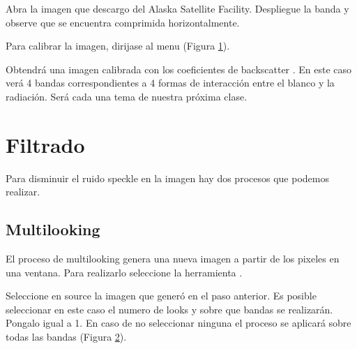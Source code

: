 Abra la imagen  que descargo del Alaska Satellite Facility. Despliegue la banda  y observe que se encuentra comprimida horizontalmente.

Para calibrar la imagen, dirijase al menu  (Figura \ref{fig:calibrar}).

 \begin{figure}[h!]
     \centering
     \hfill
     \caption{}
     \label{fig:calibrar}
 \end{figure}

 Obtendrá una imagen calibrada con los coeficientes de backscatter . En este caso verá 4 bandas correspondientes a 4 formas de interacción entre el blanco y la radiación. Será cada una tema de nuestra próxima clase.

 \section{Filtrado}

 Para disminuir el ruido speckle en la imagen hay dos procesos que podemos realizar.

 \subsection{Multilooking}

 El proceso de multilooking genera una nueva imagen a partir de los pixeles en una ventana. Para realizarlo seleccione la herramienta .

 Seleccione en source la imagen  que generó en el paso anterior. Es posible seleccionar en este caso el numero de looks y sobre que bandas se realizarán. Pongalo igual a 1. En caso de no seleccionar ninguna el proceso se aplicará sobre todas las bandas (Figura \ref{fig:multilook}).

\begin{figure}[h!]
    \centering
    \hfill
    \caption{}
    \label{fig:multilook}
\end{figure}

